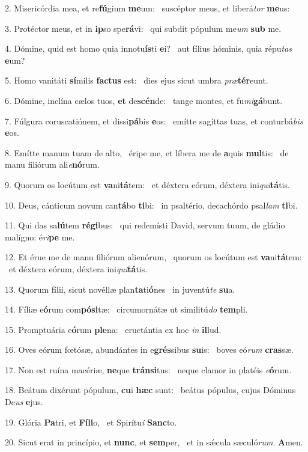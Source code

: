 2. Misericórdia mea, et re\textbf{fú}gium \textbf{me}um: \ast\  suscéptor meus, et liberá\textit{tor} \textbf{me}us:\

3. Protéctor meus, et in \textbf{ip}so spe\textbf{rá}vi: \ast\  qui subdit pópulum me\textit{um} \textbf{sub} me.\

4. Dómine, quid est homo quia innotu\textbf{ís}ti \textbf{e}i? \ast\  aut fílius hóminis, quia répu\textit{tas} \textbf{e}um?\

5. Homo vanitáti \textbf{sí}milis \textbf{fac}\textbf{tus} est: \ast\  dies ejus sicut umbra \textit{præ}\textbf{tér}eunt.\

6. Dómine, inclína cælos tuos, \textbf{et} de\textbf{scén}de: \ast\  tange montes, et fu\textit{mi}\textbf{gá}bunt.\

7. Fúlgura coruscatiónem, et dissi\textbf{pá}bis \textbf{e}os: \ast\  emítte sagíttas tuas, et conturbá\textit{bis} \textbf{e}os.\

8. Emítte manum tuam de alto, \dag\  éripe me, et líbera me de \textbf{a}quis \textbf{mul}tis: \ast\  de manu filiórum ali\textit{e}\textbf{nó}rum.\

9. Quorum os locútum est \textbf{va}ni\textbf{tá}tem: \ast\  et déxtera eórum, déxtera ini\textit{qui}\textbf{tá}tis.\

10. Deus, cánticum novum can\textbf{tá}bo \textbf{ti}bi: \ast\  in psaltério, decachórdo psal\textit{lam} \textbf{ti}bi.\

11. Qui das sa\textbf{lú}tem \textbf{ré}\textbf{gi}bus: \ast\  qui redemísti David, servum tuum, de gládio malígno: é\textit{ri}\textbf{pe} me.\

12. Et érue me de manu filiórum alienórum, \dag\  quorum os locútum est \textbf{va}ni\textbf{tá}tem: \ast\  et déxtera eórum, déxtera ini\textit{qui}\textbf{tá}tis.\

13. Quorum fílii, sicut novéllæ plan\textbf{ta}ti\textbf{ó}nes \ast\  in juventú\textit{te} \textbf{su}a.\

14. Fíliæ e\textbf{ó}rum com\textbf{pó}\textbf{si}tæ: \ast\  circumornátæ ut similitú\textit{do} \textbf{tem}pli.\

15. Promptuária e\textbf{ó}rum \textbf{ple}na: \ast\  eructántia ex hoc \textit{in} \textbf{il}lud.\

16. Oves eórum fœtósæ, abundántes in e\textbf{grés}sibus \textbf{su}is: \ast\  boves eó\textit{rum} \textbf{cras}sæ.\

17. Non est ruína macériæ, \textbf{ne}que \textbf{tráns}\textbf{i}tus: \ast\  neque clamor in platéis \textit{e}\textbf{ó}rum.\

18. Beátum dixérunt pópulum, \textbf{cu}i \textbf{hæc} sunt: \ast\  beátus pópulus, cujus Dóminus De\textit{us} \textbf{e}jus.\

19. Glória \textbf{Pa}tri, et \textbf{Fí}\textbf{li}o, \ast\  et Spirítu\textit{i} \textbf{Sanc}to.\

20. Sicut erat in princípio, et \textbf{nunc}, et \textbf{sem}per, \ast\  et in sǽcula sæculó\textit{rum}. \textbf{A}men.\

